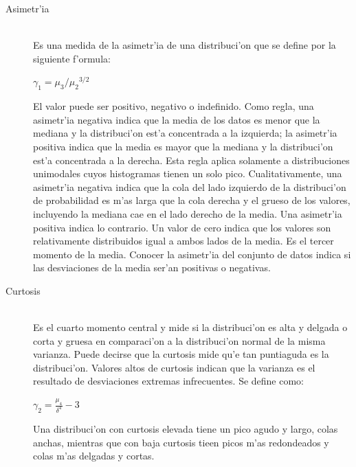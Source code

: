 \begin{description}


\item [Asimetr'ia]\hfill \\
Es una medida de la asimetr'ia de una distribuci'on que se define por la siguiente f'ormula:

\begin{center}
$\gamma_1 = \mu_3/{\mu_2}^{3/2}$
\end{center}

El valor puede ser positivo, negativo o indefinido.  Como regla, una asimetr'ia negativa indica que la media de los datos es menor que la mediana y la distribuci'on est'a concentrada a la izquierda; la asimetr'ia positiva indica que la media es mayor que la mediana y la distribuci'on est'a concentrada a la derecha. Esta regla aplica solamente a distribuciones unimodales cuyos histogramas tienen un solo pico. Cualitativamente, una asimetr'ia negativa indica que la cola del lado izquierdo de la distribuci'on de probabilidad es m'as larga que la cola derecha y el grueso de los valores, incluyendo la mediana cae en el lado derecho de la media. Una asimetr'ia positiva indica lo contrario. Un valor de cero indica que los valores son relativamente distribuidos igual a ambos lados de la media. Es el tercer momento de la media. Conocer la asimetr'ia del conjunto de datos indica si las desviaciones de la media ser'an positivas o negativas.

\item [Curtosis]\hfill \\
Es el cuarto momento central y mide si la distribuci'on es alta y delgada o corta y gruesa en comparaci'on a la distribuci'on normal de la misma varianza. Puede decirse que la curtosis mide qu'e tan puntiaguda es la distribuci'on. Valores altos de curtosis indican que la varianza es el resultado de desviaciones extremas infrecuentes. Se define como:

\begin{center}
$\gamma_2 = \frac{\mu_4}{\delta^4} - 3$ 
\end{center}

Una distribuci'on con curtosis elevada tiene un pico agudo y largo, colas anchas, mientras que con baja curtosis tieen picos m'as redondeados y colas m'as delgadas y cortas.
\end{description}

